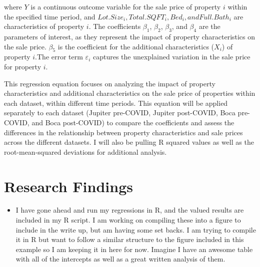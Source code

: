 \documentclass[12pt,english]{article}
\begin{document}
where $Y$ is a continuous outcome variable for the sale price of property $i$ within the specified time period, and $Lot.Size_i, Total.SQFT_i, Bed_i, and Full.Bath_i$ are characteristics of property $i$.  
The coefficients $\beta_{1}$, $\beta_{2}$, $\beta_{3}$, and $\beta_{4}$ are the parameters of interest, as they represent the impact of property characteristics on the sale price.
$\beta_{5}$ is the coefficient for the additional characteristics ($X_i$) of property $i$.The error term $\varepsilon_i$ captures the unexplained variation in the sale price for property $i$.

This regression equation focuses on analyzing the impact of property characteristics and additional characteristics on the sale price of properties within each dataset, within different time periods. This equation will be applied separately to each dataset (Jupiter pre-COVID, Jupiter post-COVID, Boca pre-COVID, and Boca post-COVID) to compare the coefficients and assess the differences in the relationship between property characteristics and sale prices across the different datasets. I will also be pulling R squared values as well as the root-mean-squared deviations for additional analysis. 

\section{Research Findings}\label{sec:results}
\begin{itemize}
    \item I have gone ahead and run my regressions in R, and the valued results are included in my R script. I am working on compiling these into a figure to include in the write up, but am having some set backs. I am trying to compile it in R but want to follow a similar structure to the figure included in this example so I am keeping it in here for now.  Imagine I have an awesome table with all of the intercepts as well as a great written analysis of them. 
\end{itemize}
\end{document}
